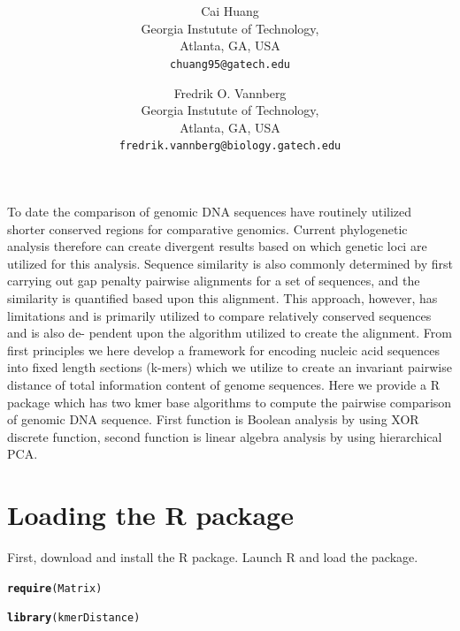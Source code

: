 \documentclass{article}\usepackage[]{graphicx}\usepackage[]{color}
\title{}
\title{\textsf{\textbf{\thetitle}}}
\author{
	Cai Huang\\[1em]Georgia Instutute of Technology,\\ Atlanta, GA, USA\\ \texttt{chuang95@gatech.edu}
	\and
	Fredrik O. Vannberg\\[1em]Georgia Instutute of Technology,\\ Atlanta, GA, USA\\ \texttt{fredrik.vannberg@biology.gatech.edu}
}
\makeatletter
\newcommand{\hlstd}[1]{\textcolor[rgb]{0.345,0.345,0.345}{#1}}%
\newcommand{\hlkwd}[1]{\textcolor[rgb]{0.737,0.353,0.396}{\textbf{#1}}}%
\newenvironment{kframe}{%
 \def\at@end@of@kframe{}%
 \ifinner\ifhmode%
  \def\at@end@of@kframe{\end{minipage}}%
  \begin{minipage}{\columnwidth}%
 \fi\fi%
 \def\FrameCommand##1{\hskip\@totalleftmargin \hskip-\fboxsep
 \colorbox{shadecolor}{##1}\hskip-\fboxsep
     \hskip-\linewidth \hskip-\@totalleftmargin \hskip\columnwidth}%
 \MakeFramed {\advance\hsize-\width
   \@totalleftmargin\z@ \linewidth\hsize
   \@setminipage}}%
 {\par\unskip\endMakeFramed%
 \at@end@of@kframe}
\newenvironment{knitrout}{}{} %
\makeatother
\begin{document}
\maketitle


\abstract

To date the comparison of genomic DNA sequences have routinely utilized shorter conserved regions for comparative genomics. Current phylogenetic analysis therefore can create divergent results based on which genetic loci are utilized for this analysis. Sequence similarity is also commonly determined by first carrying out gap penalty pairwise alignments for a set of sequences, and the similarity is quantified based upon this alignment. This approach, however, has limitations and is primarily utilized to compare relatively conserved sequences and is also de- pendent upon the algorithm utilized to create the alignment. From first principles we here develop a framework for encoding nucleic acid sequences into fixed length sections (k-mers) which we utilize to create an invariant pairwise distance of total information content of genome sequences. Here we provide a R package which has two kmer base algorithms to compute the pairwise comparison of genomic DNA sequence. First function is Boolean analysis by using XOR discrete function, second function is linear algebra analysis by using hierarchical PCA.


\tableofcontents


\section{Loading the R package}
\label{sec.loading}

First, download and install the  R package. Launch R and load the package.

\begin{knitrout}
\color{fgcolor}\begin{kframe}
\begin{alltt}
\hlkwd{require}\hlstd{(Matrix)}
\end{alltt}


{\ttfamily\noindent\itshape\color{messagecolor}{\#\# Loading required package: Matrix\\\#\# Loading required package: methods}}\begin{alltt}
\hlkwd{library}\hlstd{(kmerDistance)}
\end{alltt}
\end{kframe}
\end{knitrout}
\end{document}

